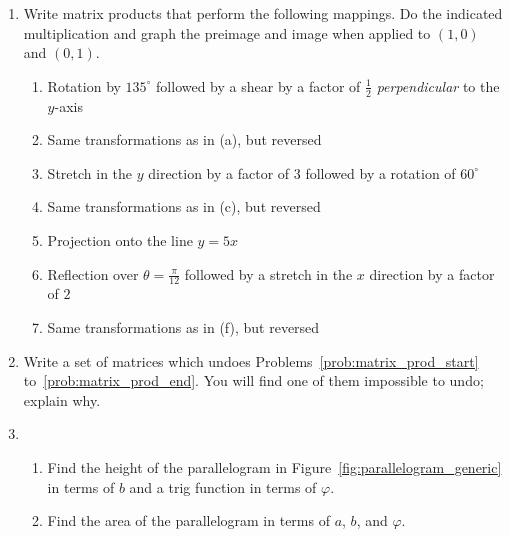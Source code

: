 \documentclass[../gatm.tex]{subfiles}
\begin{document}
\begin{enumerate}
\item Write matrix products that perform the following mappings. Do the indicated multiplication and graph the preimage and image when applied to $(1,0)$ and $(0,1)$.
\begin{enumerate}
\item Rotation by $135^\circ$ followed by a shear by a factor of $\frac{1}{2}$ \textit{perpendicular} to the $y$-axis \label{prob:matrix_prod_start}
\item Same transformations as in (a), but reversed
\item Stretch in the $y$ direction by a factor of $3$ followed by a rotation of $60^\circ$
\item Same transformations as in (c), but reversed
\item Projection onto the line $y=5x$
\item Reflection over $\theta=\frac{\pi}{12}$ followed by a stretch in the $x$ direction by a factor of $2$
\item Same transformations as in (f), but reversed \label{prob:matrix_prod_end}
\end{enumerate}
\item Write a set of matrices which undoes Problems~\ref{prob:matrix_prod_start} to~\ref{prob:matrix_prod_end}. You will find one of them impossible to undo; explain why.
\item \begin{enumerate}
\item Find the height of the parallelogram in Figure~\ref{fig:parallelogram_generic} in terms of $b$ and a trig function in terms of $\varphi$.
\item Find the area of the parallelogram in terms of $a$, $b$, and $\varphi$.
\end{enumerate}
\setcounter{problem_i}{\value{enumi}}
\end{enumerate}
\end{document}

